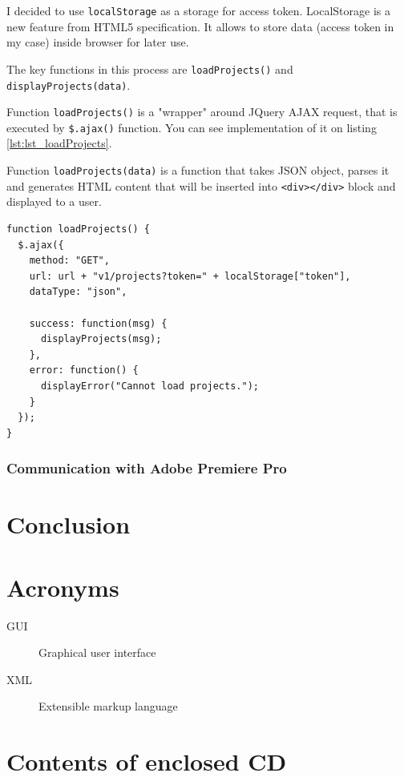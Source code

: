 \documentclass[thesis=B,english]{FITthesis}[2012/10/20]
\begin{document}
I decided to use \texttt{localStorage} as a storage for access token. LocalStorage is a new feature from HTML5 specification. It allows to store data (access token in my case) inside browser for later use.

The key functions in this process are \texttt{loadProjects()} and \texttt{displayProjects(data)}. 

Function \texttt{loadProjects()} is a "wrapper" around JQuery AJAX request, that is executed by \texttt{\$.ajax()} function. You can see implementation of it on listing \ref{lst:lst_loadProjects}.

Function \texttt{loadProjects(data)} is a function that takes JSON object, parses it and generates HTML content that will be inserted into \texttt{<div></div>} block and displayed to a user.
\begin{lstlisting}[caption=loadProjects() function, label=lst:lst_loadProjects]
function loadProjects() {
  $.ajax({
    method: "GET",
    url: url + "v1/projects?token=" + localStorage["token"],
    dataType: "json",

    success: function(msg) {
      displayProjects(msg);
    },
    error: function() {
      displayError("Cannot load projects.");
    }
  });
}
\end{lstlisting}

\subsection{Communication with Adobe Premiere Pro}

\chapter{Conclusion}





\appendix

\chapter{Acronyms}
\begin{description}
	\item[GUI] Graphical user interface
	\item[XML] Extensible markup language
\end{description}


\chapter{Contents of enclosed CD}
\end{document}
